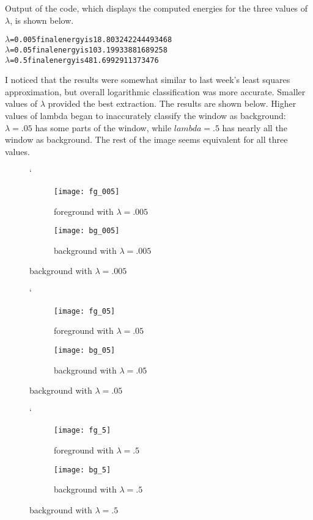 \documentclass[10pt]{article}
\theoremstyle{plain}
\theoremstyle{definition}
\numberwithin{equation}{section}
\begin{document}
Output of the code, which displays the computed energies for the three values of $\lambda$, is shown below.


\begin{alltt}
	% python c3_1.py
	\( \lambda\)=0.005	final energy is 18.803242244493468
	\( \lambda\)=0.05	 final energy is 103.19933881689258
	\( \lambda\)=0.5 	 final energy is 481.6992911373476
\end{alltt}

I noticed that the results were somewhat similar to last week's least squares approximation, but overall logarithmic classification was more accurate. Smaller values of $\lambda$ provided the best extraction. The results are shown below. Higher values of lambda began to inaccurately classify the window as background: $\lambda=.05$ has some parts of the window, while $lambda=.5$ has nearly all the window as background. The rest of the image seems equivalent for all three values.
\clearpage
\begin{figure}
	\centering`
	\begin{subfigure}[b]{0.45\textwidth}
		\centering
		\texttt{[image: fg\_005]}
		\caption{foreground with $\lambda=.005$}
	\end{subfigure}
	\begin{subfigure}[b]{0.45\textwidth}
		\centering
		\texttt{[image: bg\_005]}
		\caption{background with $\lambda = .005$ }
	\end{subfigure}
\end{figure}
\begin{figure}
		\centering`
		\begin{subfigure}[b]{0.45\textwidth}
			\centering
			\texttt{[image: fg\_05]}
			\caption{foreground with $\lambda=.05$}
		\end{subfigure}
		\begin{subfigure}[b]{0.45\textwidth}
			\centering
			\texttt{[image: bg\_05]}
			\caption{background with $\lambda = .05$ }
		\end{subfigure}
\end{figure}

\begin{figure}
		\centering`
		\begin{subfigure}[b]{0.45\textwidth}
			\centering
			\texttt{[image: fg\_5]}
			\caption{foreground with $\lambda=.5$}
		\end{subfigure}
		\begin{subfigure}[b]{0.45\textwidth}
			\centering
			\texttt{[image: bg\_5]}
			\caption{background with $\lambda = .5$ }
		\end{subfigure}
\end{figure}
\clearpage
\end{document}
